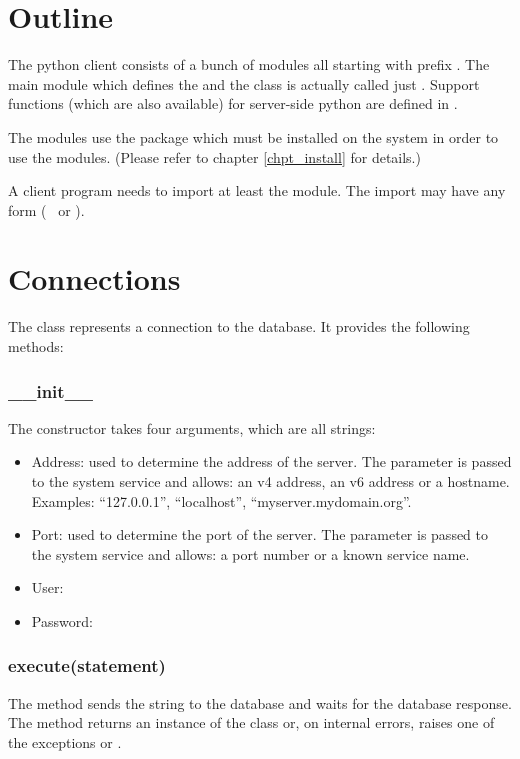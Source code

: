 \section{Outline}
The python client consists of a bunch
of modules all starting with prefix .
The main module which defines
the  and the  class
is actually called just .
Support functions (which are also available)
for server-side python are defined in
.

The modules use the package 
which must be installed on the system in order
to use the  modules.
(Please refer to chapter
\ref{chpt_install} for details.)

A client program needs to import at least
the  module. The import may have
any form (\ie\  or
).

\section{Connections}
The  class represents
a  connection to the
database. It provides the following 
methods:
\subsubsection{\_\_init\_\_}
The constructor takes four arguments,
which are all strings:
\begin{itemize}
\item Address:
used to determine the address of the server.
The parameter is passed to the system service
 and allows:
an v4 address,
an v6 address or
a hostname.
Examples: ``127.0.0.1'', ``localhost'',
``myserver.mydomain.org''.

\item Port:
used to determine the port of the server.
The parameter is passed to the system service
 and allows:
a port number or a known service name.

\item User:
\item Password:
\end{itemize}

\subsubsection{execute(statement)}
The method sends the string  to the database
and waits for the database response.
The method returns an instance of the  class
or, on internal errors, raises one of the exceptions
 or .

